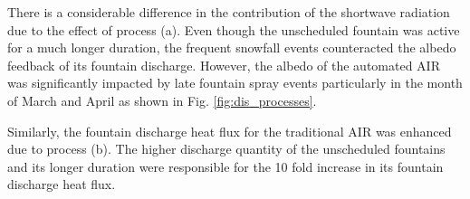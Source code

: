 \documentclass[tc, manuscript]{copernicus}
\begin{document}
There is a considerable difference in the contribution of the shortwave radiation due to the effect of process
(a). Even though the unscheduled fountain was active for a much longer duration, the frequent snowfall events
counteracted the albedo feedback of its fountain discharge. However, the albedo of the automated AIR was
significantly impacted by late fountain spray events particularly in the month of March and April as shown in
Fig. \ref{fig:dis_processes}.

Similarly, the fountain discharge heat flux for the traditional AIR was enhanced due to process (b). The higher
discharge quantity of the unscheduled fountains and its longer duration were responsible for the 10 fold
increase in its fountain discharge heat flux.


\appendixtables   %
\end{document}
